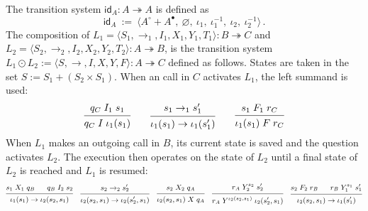 \documentclass[acmsmall,screen,review,anonymous]{acmart}
\newcommand{\kw}[1]{\ensuremath{ \mathsf{#1} }}
\newcommand{\que}{\circ}
\newcommand{\ans}{\bullet}
\begin{document}
\begin{definition} \label{def:lcomp} %
The transition system
$\kw{id}_A : A \twoheadrightarrow A$
is defined as
\[
  \kw{id}_A \::=\:
  \big\langle
    A^\que + A^\ans, \:
    \varnothing, \:
    \iota_1, \:
    \iota_1^{-1}, \:
    \iota_2, \:
    \iota_2^{-1}
  \big\rangle
  \,.
\]
The composition of
$
  L_1 = \langle S_1, {\rightarrow_1}, I_1, X_1, Y_1, T_1 \rangle
    : B \twoheadrightarrow C
$ and $
  L_2 = \langle S_2, {\rightarrow_2}, I_2, X_2, Y_2, T_2 \rangle
    : A \twoheadrightarrow B
$,
is the transition system
$
  L_1 \odot L_2 :=
  \langle S, {\rightarrow}, I, X, Y, F \rangle
  : A \twoheadrightarrow C
$ defined as follows.
States are taken in the set
$
    S := S_1 + (S_2 \times S_1)
$.
When an call in $C$ activates $L_1$,
the left summand is used:
\[
  \begin{prooftree}
    \hypo{q_C \mathrel{I_1} s_1}
    \infer1{q_C \mathrel{I} \iota_1(s_1)}
  \end{prooftree}
  \qquad
  \begin{prooftree}
    \hypo{s_1 \rightarrow_1 s_1'}
    \infer1{\iota_1(s_1) \rightarrow \iota_1(s_1')}
  \end{prooftree}
  \qquad
  \begin{prooftree}
    \hypo{s_1 \mathrel{F_1} r_C}
    \infer1{\iota_1(s_1) \mathrel{F} r_C}
  \end{prooftree}
\]
When $L_1$ makes an outgoing call in $B$,
its current state is saved and
the question activates $L_2$.
The execution then
operates on the state of $L_2$
until a final state of $L_2$ is reached
and $L_1$ is resumed:
\[
  \small
  \begin{prooftree}
    \hypo{s_1 \mathrel{X_1} q_B}
    \hypo{q_B \mathrel{I_2} s_2}
    \infer2{\iota_1(s_1) \rightarrow \iota_2(s_2, s_1)}
  \end{prooftree}
  \quad
  \begin{prooftree}
    \hypo{s_2 \rightarrow_2 s_2'}
    \infer1{\iota_2(s_2, s_1) \rightarrow \iota_2(s_2', s_1)}
  \end{prooftree}
  \quad
  \begin{prooftree}
    \hypo{s_2 \mathrel{X_2} q_A}
    \infer1{\iota_2(s_2, s_1) \mathrel{X} q_A}
  \end{prooftree}
  \quad
  \begin{prooftree}
    \hypo{r_A \mathrel{Y_2^{s_2}} s_2'}
    \infer1{r_A \mathrel{Y^{\iota_2(s_2, s_1)}} \iota_2(s_2', s_1)}
  \end{prooftree}
  \quad
  \begin{prooftree}
    \hypo{s_2 \mathrel{F_2} r_B}
    \hypo{r_B \mathrel{Y_1^{s_1}} s_1'}
    \infer2{\iota_2(s_2, s_1) \rightarrow \iota_1(s_1')}
  \end{prooftree}
\]
\end{definition}
\end{document}
